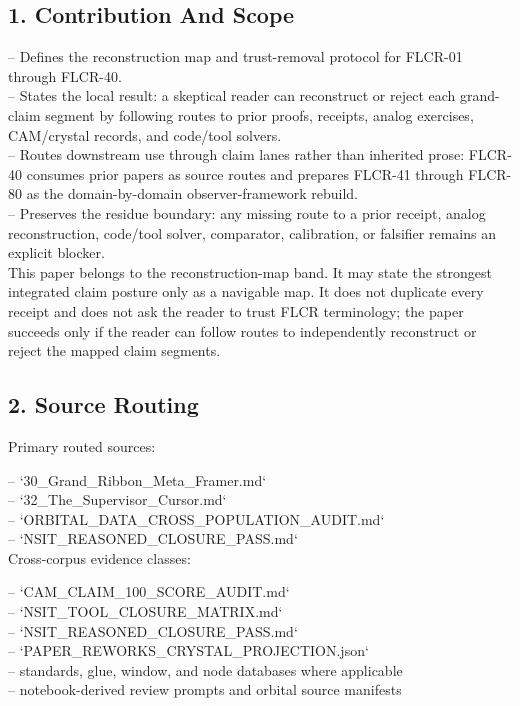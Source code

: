 \documentclass[11pt]{article}
\begin{document}
\subsection*{1. Contribution And Scope}

\noindent{}-- Defines the reconstruction map and trust-removal protocol for FLCR-01 through FLCR-40.\\
\noindent{}-- States the local result: a skeptical reader can reconstruct or reject each grand-claim segment by following routes to prior proofs, receipts, analog exercises, CAM/crystal records, and code/tool solvers.\\
\noindent{}-- Routes downstream use through claim lanes rather than inherited prose: FLCR-40 consumes prior papers as source routes and prepares FLCR-41 through FLCR-80 as the domain-by-domain observer-framework rebuild.\\
\noindent{}-- Preserves the residue boundary: any missing route to a prior receipt, analog reconstruction, code/tool solver, comparator, calibration, or falsifier remains an explicit blocker.\\

This paper belongs to the reconstruction-map band. It may state the strongest integrated claim posture only as a navigable map. It does not duplicate every receipt and does not ask the reader to trust FLCR terminology; the paper succeeds only if the reader can follow routes to independently reconstruct or reject the mapped claim segments.

\subsection*{2. Source Routing}

Primary routed sources:

\noindent{}-- `30\_Grand\_Ribbon\_Meta\_Framer.md`\\
\noindent{}-- `32\_The\_Supervisor\_Cursor.md`\\
\noindent{}-- `ORBITAL\_DATA\_CROSS\_POPULATION\_AUDIT.md`\\
\noindent{}-- `NSIT\_REASONED\_CLOSURE\_PASS.md`\\

Cross-corpus evidence classes:

\noindent{}-- `CAM\_CLAIM\_100\_SCORE\_AUDIT.md`\\
\noindent{}-- `NSIT\_TOOL\_CLOSURE\_MATRIX.md`\\
\noindent{}-- `NSIT\_REASONED\_CLOSURE\_PASS.md`\\
\noindent{}-- `PAPER\_REWORKS\_CRYSTAL\_PROJECTION.json`\\
\noindent{}-- standards, glue, window, and node databases where applicable\\
\noindent{}-- notebook-derived review prompts and orbital source manifests\\
\end{document}
